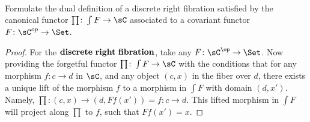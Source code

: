 \documentclass[../../main]{subfiles}
\begin{document}
\paragraph{}
\begin{exercise}
Formulate the dual definition of a discrete right fibration satisfied by the
canonical functor $\prod \colon \int F \rightarrow \sC$ associated to a covariant
functor $F \colon \sC^{op} \rightarrow \Set$.
\end{exercise}

\begin{proof}
For the $\bold{discrete \ right \ fibration}$, take any $F\colon\sC^{\op}\rightarrow
\Set$. Now providing the forgetful functor $\prod\colon \int F \rightarrow\sC$
with the conditions that for any morphism $f\colon c \rightarrow d$ in $\sC$, and any
object $(c, x)$ in the fiber over $d$, there exists a unique lift of the
morphism $f$ to a morphism in $\int F$ with domain $(d,x')$. Namely, $\prod \colon(c,x) \rightarrow (d, Ff(x')) = f\colon c \rightarrow d$. This lifted morphism in
$\int F$ will project along $\prod$ to $f$, such that $Ff(x') = x$.

\end{proof}
\end{document}
